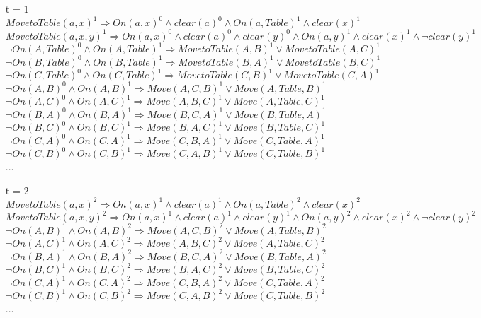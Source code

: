 \normalfont\documentclass[letterpaper,11pt]{article}
\begin{document}
\begin{enumerate}
\begin{enumerate}
		\item [t = 1]
		$MovetoTable(a,x)^1 \Rightarrow On(a,x)^0 \land clear(a)^0 \land On(a,Table)^1 \land clear(x)^1$\\
		$MovetoTable(a,x,y)^1 \Rightarrow On(a,x)^0 \land clear(a)^0 \land clear(y)^0\land On(a,y)^1 \land clear(x)^1 \land \neg clear(y)^1$\\
		$\neg On(A,Table)^0 \land On(A,Table)^1 \Rightarrow MovetoTable(A,B)^1 \lor MovetoTable(A,C)^1$\\
		$\neg On(B,Table)^0 \land On(B,Table)^1 \Rightarrow MovetoTable(B,A)^1 \lor MovetoTable(B,C)^1$\\
		$\neg On(C,Table)^0 \land On(C,Table)^1 \Rightarrow MovetoTable(C,B)^1 \lor MovetoTable(C,A)^1$\\
		$\neg On(A,B)^0 \land On(A,B)^1 \Rightarrow Move(A,C,B)^1 \lor Move(A,Table,B)^1$\\
		$\neg On(A,C)^0 \land On(A,C)^1 \Rightarrow Move(A,B,C)^1 \lor Move(A,Table,C)^1$\\
		$\neg On(B,A)^0 \land On(B,A)^1 \Rightarrow Move(B,C,A)^1 \lor Move(B,Table,A)^1$\\
		$\neg On(B,C)^0 \land On(B,C)^1 \Rightarrow Move(B,A,C)^1 \lor Move(B,Table,C)^1$\\
		$\neg On(C,A)^0 \land On(C,A)^1 \Rightarrow Move(C,B,A)^1 \lor Move(C,Table,A)^1$\\
		$\neg On(C,B)^0 \land On(C,B)^1 \Rightarrow Move(C,A,B)^1 \lor Move(C,Table,B)^1$\\
		...
		\item [t = 2]
		$MovetoTable(a,x)^2 \Rightarrow On(a,x)^1 \land clear(a)^1 \land On(a,Table)^2 \land clear(x)^2$\\
		$MovetoTable(a,x,y)^2 \Rightarrow On(a,x)^1 \land clear(a)^1 \land clear(y)^1\land On(a,y)^2 \land clear(x)^2 \land \neg clear(y)^2$\\
		$\neg On(A,B)^1 \land On(A,B)^2 \Rightarrow Move(A,C,B)^2 \lor Move(A,Table,B)^2$\\
		$\neg On(A,C)^1 \land On(A,C)^2 \Rightarrow Move(A,B,C)^2 \lor Move(A,Table,C)^2$\\
		$\neg On(B,A)^1 \land On(B,A)^2 \Rightarrow Move(B,C,A)^2 \lor Move(B,Table,A)^2$\\
		$\neg On(B,C)^1 \land On(B,C)^2 \Rightarrow Move(B,A,C)^2 \lor Move(B,Table,C)^2$\\
		$\neg On(C,A)^1 \land On(C,A)^2 \Rightarrow Move(C,B,A)^2 \lor Move(C,Table,A)^2$\\
		$\neg On(C,B)^1 \land On(C,B)^2 \Rightarrow Move(C,A,B)^2 \lor Move(C,Table,B)^2$\\
		...
	\end{enumerate}

\end{enumerate}
\end{document}

